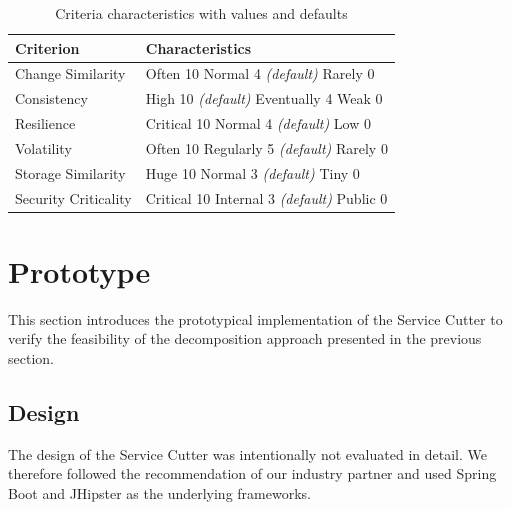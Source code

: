\begin{table}[H]
	\centering
	\caption{Criteria characteristics with values and defaults}
	\label{tab:characteristics}
	\begin{tabular}{|p{100pt}|p{150pt}|}
		\hline	
		\textbf{Criterion} & \textbf{Characteristics} \\
		\hline
		Change Similarity & Often 10 \newline Normal 4 \textit{(default)} \newline Rarely 0 \\
		\hline
		Consistency & High 10 \textit{(default)} \newline Eventually 4 \newline Weak 0 \\
		\hline
		Resilience & Critical 10 \newline Normal 4 \textit{(default)} \newline Low 0 \\
		\hline
		Volatility & Often 10 \newline Regularly 5 \textit{(default)} \newline Rarely 0 \\
		\hline
		Storage Similarity & Huge 10 \newline Normal 3 \textit{(default)} \newline Tiny 0 \\
		\hline
		Security Criticality & Critical 10 \newline Internal 3 \textit{(default)} \newline Public 0 \\
		\hline
	\end{tabular}
\end{table}


\section{Prototype} 

This section introduces the prototypical implementation of the Service Cutter to verify the feasibility of the decomposition approach presented in the previous section.

\subsection{Design}

The design of the Service Cutter was intentionally not evaluated in detail. We therefore followed the recommendation of our industry partner and used Spring Boot\cite{springboot} and JHipster\cite{jhipster} as the underlying frameworks.


